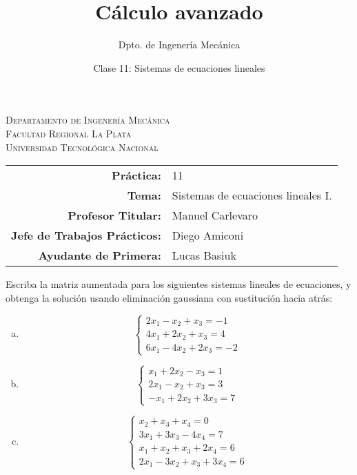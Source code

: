 \documentclass[11pt]{article}
\title{Cálculo avanzado}
\author{Dpto. de Ingenería Mecánica}
\date{Clase 11: Sistemas de ecuaciones lineales}
\begin{document}

\begin{center}
\end{center} 

\begin{center}
\vspace{\baselineskip}
\Large{\textsc{Departamento de Ingenería Mecánica}} \\
\textsc{Facultad Regional La Plata} \\
\textsc{Universidad Tecnológica Nacional}
\end{center}


\begin{center}
\begin{tabular}{r l}
    \textbf{Práctica:} & 11 \\
 \textbf{Tema:} & Sistemas de ecuaciones lineales I. \\
 \textbf{Profesor Titular:} & Manuel Carlevaro \\
 \textbf{Jefe de Trabajos Prácticos:} & Diego Amiconi \\
 \textbf{Ayudante de Primera:} & Lucas Basiuk 
\end{tabular}\end{center}

\vspace{1em}

\begin{question} %
Escriba la matriz aumentada para los siguientes sistemas lineales de ecuaciones, y obtenga la solución usando eliminación gaussiana con sustitución hacia atrás:
\begin{enumerate}[a)]
    \item \[ \begin{cases} 2 x_1 - x_2 + x_3 = -1 \\
                       4 x_1 + 2 x_2 + x_3 = 4 \\ 
                       6 x_1 - 4 x_2 + 2 x_3 = -2 
        \end{cases} \]
    \item \[ \begin{cases} x_1 + 2 x_2 - x_3 = 1 \\
                      2 x_1 - x_2 + x_3 = 3 \\ 
                      -x_1 + 2 x_2 + 3 x_3 = 7 
        \end{cases} \]
    \item \[ \begin{cases} x_2 + x_3 + x_4 = 0 \\
                      3 x_1 + 3 x_3 - 4 x_4 = 7 \\ 
                      x_1 + x_2 + x_3 + 2 x_4 = 6 \\
                      2 x_1 - 3 x_2 + x_3 + 3 x_4 = 6
        \end{cases} \]
\end{enumerate}
\end{question}
\end{document}
